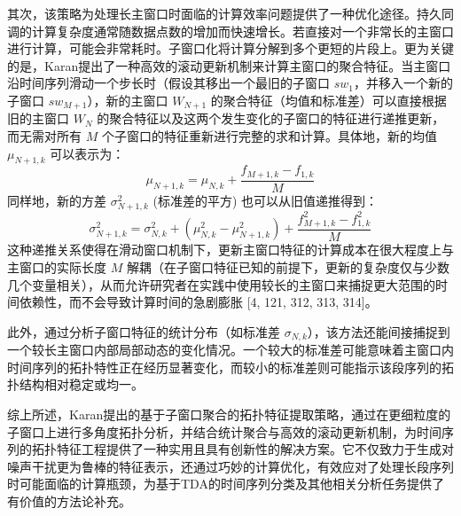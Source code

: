         其次，该策略为处理长主窗口时面临的计算效率问题提供了一种优化途径。持久同调的计算复杂度通常随数据点数的增加而快速增长。若直接对一个非常长的主窗口进行计算，可能会非常耗时。子窗口化将计算分解到多个更短的片段上。更为关键的是，Karan提出了一种高效的滚动更新机制来计算主窗口的聚合特征。当主窗口沿时间序列滑动一个步长时（假设其移出一个最旧的子窗口 $sw_1$，并移入一个新的子窗口 $sw_{M+1}$），新的主窗口 $W_{N+1}$ 的聚合特征（均值和标准差）可以直接根据旧的主窗口 $W_N$ 的聚合特征以及这两个发生变化的子窗口的特征进行递推更新，而无需对所有 $M$ 个子窗口的特征重新进行完整的求和计算。具体地，新的均值 $\mu_{N+1,k}$ 可以表示为：
        \begin{equation}
            \mu_{N+1,k} = \mu_{N,k} + \frac{f_{M+1,k} - f_{1,k}}{M}
            \label{eq:recursive_mean}
        \end{equation}
        同样地，新的方差 $\sigma_{N+1,k}^2$ (标准差的平方) 也可以从旧值递推得到：
        \begin{equation}
            \sigma_{N+1,k}^2 = \sigma_{N,k}^2 + (\mu_{N,k}^2 - \mu_{N+1,k}^2) + \frac{f_{M+1,k}^2 - f_{1,k}^2}{M}
            \label{eq:recursive_variance}
        \end{equation}
        这种递推关系使得在滑动窗口机制下，更新主窗口特征的计算成本在很大程度上与主窗口的实际长度 $M$ 解耦（在子窗口特征已知的前提下，更新的复杂度仅与少数几个变量相关），从而允许研究者在实践中使用较长的主窗口来捕捉更大范围的时间依赖性，而不会导致计算时间的急剧膨胀 [4, 121, 312, 313, 314]。
        
        此外，通过分析子窗口特征的统计分布（如标准差 $\sigma_{N,k}$），该方法还能间接捕捉到一个较长主窗口内部局部动态的变化情况。一个较大的标准差可能意味着主窗口内时间序列的拓扑特性正在经历显著变化，而较小的标准差则可能指示该段序列的拓扑结构相对稳定或均一。
        
        综上所述，Karan提出的基于子窗口聚合的拓扑特征提取策略，通过在更细粒度的子窗口上进行多角度拓扑分析，并结合统计聚合与高效的滚动更新机制，为时间序列的拓扑特征工程提供了一种实用且具有创新性的解决方案。它不仅致力于生成对噪声干扰更为鲁棒的特征表示，还通过巧妙的计算优化，有效应对了处理长段序列时可能面临的计算瓶颈，为基于TDA的时间序列分类及其他相关分析任务提供了有价值的方法论补充。
        

